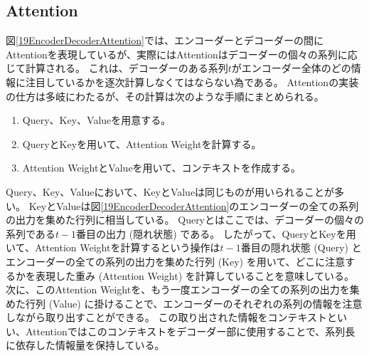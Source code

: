\subsection{Attention} \label{DL:Atten:Attention}

図\ref{19EncoderDecoderAttention}では、エンコーダーとデコーダーの間にAttentionを表現しているが、実際にはAttentionはデコーダーの個々の系列に応じて計算される。
これは、デコーダーのある系列$t$がエンコーダー全体のどの情報に注目しているかを逐次計算しなくてはならない為である。
Attentionの実装の仕方は多岐にわたるが、その計算は次のような手順にまとめられる。

\begin{enumerate}
  \item Query、Key、Valueを用意する。
  \item QueryとKeyを用いて、Attention Weightを計算する。
  \item Attention WeightとValueを用いて、コンテキストを作成する。
\end{enumerate}

Query、Key、Valueにおいて、KeyとValueは同じものが用いられることが多い。
KeyとValueは図\ref{19EncoderDecoderAttention}のエンコーダーの全ての系列の出力を集めた行列に相当している。
Queryとはここでは、デコーダーの個々の系列である$t-1$番目の出力 (隠れ状態) である。
したがって、QueryとKeyを用いて、Attention Weightを計算するという操作は$t-1$番目の隠れ状態 (Query) とエンコーダーの全ての系列の出力を集めた行列 (Key) を用いて、どこに注意するかを表現した重み (Attention Weight) を計算していることを意味している。
次に、このAttention Weightを、もう一度エンコーダーの全ての系列の出力を集めた行列 (Value) に掛けることで、エンコーダーのそれぞれの系列の情報を注意しながら取り出すことができる。
この取り出された情報をコンテキストといい、Attentionではこのコンテキストをデコーダー部に使用することで、系列長に依存した情報量を保持している。

